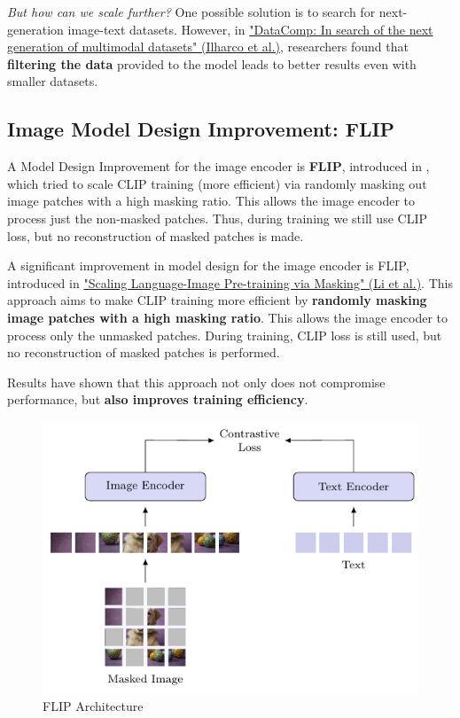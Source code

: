 \textit{But how can we scale further?} One possible solution is to search for next-generation image-text datasets. However, in \href{https://arxiv.org/pdf/2304.14108}{"DataComp: In search of the next generation of multimodal datasets" (Ilharco et al.)}, researchers found that \textbf{filtering the data} provided to the model leads to better results even with smaller datasets.


\subsection{Image Model Design Improvement: FLIP}



A Model Design Improvement for the image encoder is \textbf{FLIP}, introduced in , which tried to scale CLIP training (more efficient) via randomly masking out image patches with a high masking ratio. This allows the image encoder to process just the non-masked patches. Thus, during training we still use CLIP loss, but no reconstruction of masked patches is made.

A significant improvement in model design for the image encoder is FLIP, introduced in \href{https://arxiv.org/pdf/2212.00794}{"Scaling Language-Image Pre-training via Masking" (Li et al.)}. This approach aims to make CLIP training more efficient by \textbf{randomly masking image patches with a high masking ratio}. This allows the image encoder to process only the unmasked patches. During training, CLIP loss is still used, but no reconstruction of masked patches is performed.

Results have shown that this approach not only does not compromise performance, but \textbf{also improves training efficiency}.

\begin{figure}[!htbp]
    \centering
    \includegraphics[width=0.8\linewidth]{tikz/chapter11 - FLIP.pdf}
    \caption{FLIP Architecture}
\end{figure}

